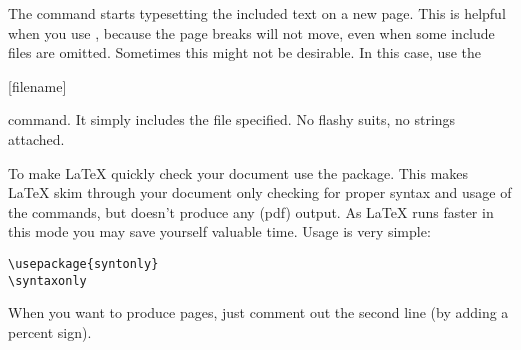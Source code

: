 The  command starts typesetting the included text on a new
page. This is helpful when you use , because the
page breaks will not move, even when some include files are omitted.
Sometimes this might not be desirable. In this case, use the
\begin{lscommand}
  [filename]
\end{lscommand}
command. It simply includes the file specified.
No flashy suits, no strings attached.

To make \LaTeX{} quickly check your document use the 
package. This makes \LaTeX{} skim through your document only checking for
proper syntax and usage of the commands, but doesn't produce any (pdf) output.
As \LaTeX{} runs faster in this mode you may save yourself valuable time.
Usage is very simple:

\begin{verbatim}
\usepackage{syntonly}
\syntaxonly
\end{verbatim}
When you want to produce pages, just comment out the second line
(by adding a percent sign).
